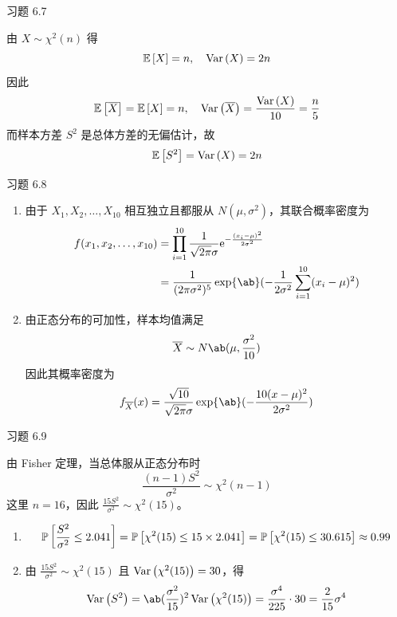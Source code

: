 \begin{problem}
    习题 6.7
    \begin{solution}
        由 $X \sim \chi^2(n)$ 得
        $$
        \operatorname{\mathbb{E}}\left[X\right] = n, \quad \operatorname{Var}\left(X\right) = 2n
        $$
        因此
        $$
        \operatorname{\mathbb{E}}\left[\overline{X}\right] = \operatorname{\mathbb{E}}\left[X\right] = n, \quad \operatorname{Var}\left(\overline{X}\right) = \frac{\operatorname{Var}\left(X\right)}{10} = \frac{n}{5}
        $$
        而样本方差 $S^2$ 是总体方差的无偏估计，故
        $$
        \operatorname{\mathbb{E}}\left[S^2\right] = \operatorname{Var}\left(X\right) = 2n
        $$
    \end{solution}
\end{problem}

\begin{problem}
    习题 6.8
    \begin{solution}
        \begin{enumerate}
            \item[\textbf{1)}] 由于 $X_1, X_2, \dots, X_{10}$ 相互独立且都服从 $N(\mu, \sigma^2)$，其联合概率密度为
            $$
            \begin{aligned}
                f(x_1, x_2, \dots, x_{10}) & = \prod_{i = 1}^{10} \frac{1}{\sqrt{2 \pi} \sigma} \E^{-\frac{(x_i - \mu)^2}{2 \sigma^2}} \\
                & = \frac{1}{(2 \pi \sigma^2)^5} \exp\ab(- \frac{1}{2 \sigma^2} \sum_{i = 1}^{10} (x_i - \mu)^2)
            \end{aligned}
            $$
            \item[\textbf{2)}] 由正态分布的可加性，样本均值满足
            $$
            \overline{X} \sim N\ab(\mu, \frac{\sigma^2}{10})
            $$
            因此其概率密度为
            $$
            f_{\overline{X}}(x) = \frac{\sqrt{10}}{\sqrt{2 \pi} \sigma} \exp\ab(- \frac{10 (x - \mu)^2}{2 \sigma^2})
            $$
        \end{enumerate}
    \end{solution}
\end{problem}

\begin{problem}
    习题 6.9
    \begin{solution}
        由 Fisher 定理，当总体服从正态分布时
        $$
        \frac{(n - 1) S^2}{\sigma^2} \sim \chi^2(n - 1)
        $$
        这里 $n = 16$，因此 $\frac{15 S^2}{\sigma^2} \sim \chi^2(15)$。
        \begin{enumerate}
            \item[\textbf{1)}]
            $$
            \operatorname{\mathbb{P}}\left[\frac{S^2}{\sigma^2} \le 2.041\right] = \operatorname{\mathbb{P}}\left[\chi^2(15) \le 15 \times 2.041\right] = \operatorname{\mathbb{P}}\left[\chi^2(15) \le 30.615\right] \approx 0.99
            $$
            \item[\textbf{2)}] 由 $\frac{15 S^2}{\sigma^2} \sim \chi^2(15)$ 且 $\operatorname{Var}\left(\chi^2(15)\right) = 30$，得
            $$
            \variance{S^2} = \ab(\frac{\sigma^2}{15})^2 \variance{\chi^2(15)} = \frac{\sigma^4}{225} \cdot 30 = \frac{2}{15} \sigma^4
            $$
        \end{enumerate}
    \end{solution}
\end{problem}

